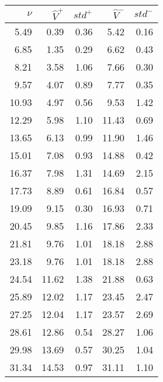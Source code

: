\documentclass{article}
\begin{document}
\begin{tabular}{rrrrr}\hline 
$\nu$  & $\widehat{V}^{+}$ & $std^{+}$ & $\widehat{V}^{-}$ & $std^{-}$ \\\hline 
    5.49 &     0.39 &     0.36 &     5.42  &     0.16 \\ 
    6.85 &     1.35 &     0.29 &     6.62  &     0.43 \\ 
    8.21 &     3.58 &     1.06 &     7.66  &     0.30 \\ 
    9.57 &     4.07 &     0.89 &     7.77  &     0.35 \\ 
   10.93 &     4.97 &     0.56 &     9.53  &     1.42 \\ 
   12.29 &     5.98 &     1.10 &    11.43  &     0.69 \\ 
   13.65 &     6.13 &     0.99 &    11.90  &     1.46 \\ 
   15.01 &     7.08 &     0.93 &    14.88  &     0.42 \\ 
   16.37 &     7.98 &     1.31 &    14.69  &     2.15 \\ 
   17.73 &     8.89 &     0.61 &    16.84  &     0.57 \\ 
   19.09 &     9.15 &     0.30 &    16.93  &     0.71 \\ 
   20.45 &     9.85 &     1.16 &    17.86  &     2.33 \\ 
   21.81 &     9.76 &     1.01 &    18.18  &     2.88 \\ 
   23.18 &     9.76 &     1.01 &    18.18  &     2.88 \\ 
   24.54 &    11.62 &     1.38 &    21.88  &     0.63 \\ 
   25.89 &    12.02 &     1.17 &    23.45  &     2.47 \\ 
   27.25 &    12.04 &     1.17 &    23.57  &     2.69 \\ 
   28.61 &    12.86 &     0.54 &    28.27  &     1.06 \\ 
   29.98 &    13.69 &     0.57 &    30.25  &     1.04 \\ 
   31.34 &    14.53 &     0.97 &    31.11  &     1.10 \\ \hline 
\end{tabular}
\end{document}
